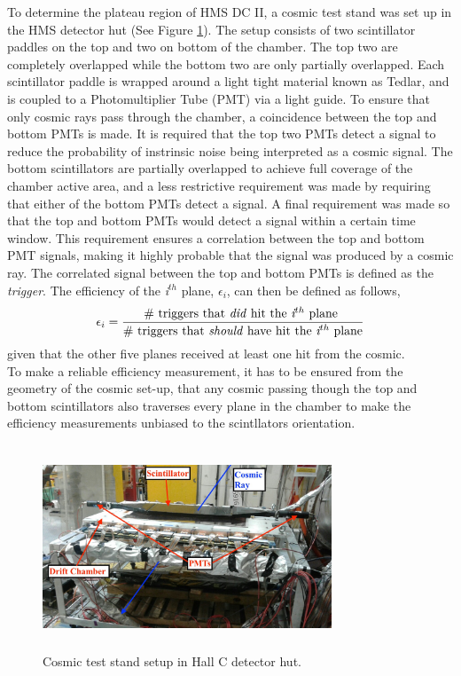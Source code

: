 \documentclass[letterpaper, 10 pt, conference]{ieeeconf}  %
\begin{document}
\indent To determine the plateau region of HMS DC II,  a cosmic test stand was set up in the HMS detector hut (See Figure \ref{fig:cosmic_stand}). The setup consists of two scintillator paddles on the top
and two on bottom of the chamber. The top two are completely overlapped while the bottom two are only partially overlapped. Each scintillator paddle is wrapped around a light tight material known as Tedlar,
and is coupled to a Photomultiplier Tube (PMT) via a light guide. To ensure that only cosmic rays pass through the chamber, a coincidence between the top and bottom PMTs is made. It is required that the top
two PMTs detect a signal to reduce the probability of instrinsic noise being interpreted as a cosmic signal. The bottom scintillators are partially overlapped to achieve full coverage of the chamber active
area, and a less restrictive requirement was made by requiring that either of the bottom PMTs detect a signal. A final requirement was made so that the top and bottom PMTs would detect a signal within a
certain time window. This requirement ensures a correlation between the top and bottom PMT signals, making it highly probable that the signal was produced by a cosmic ray. The correlated signal between the top and
bottom PMTs is defined as the \textit{trigger}. The efficiency of the \textit{i$^{th}$} plane, $\epsilon_{i}$, can then be defined as follows,
\begin{equation}
\epsilon_{i} = \frac{\# \text{ triggers that \textit{did} hit the \textit{i$^{th}$} plane } }{\# \text{ triggers that \textit{should} have hit the \textit{i$^{th}$} plane} } 
\end{equation}
given that the other five planes received at least one hit from the cosmic. \\
\indent To make a reliable efficiency measurement, it has to be ensured from the geometry of the cosmic set-up, that any cosmic passing though the top and bottom scintillators also traverses every plane in the chamber
to make the efficiency measurements unbiased to the scintllators orientation. 
\begin{figure}[h!]
  \centering
  \includegraphics[width=3.4in, height=2.4in]{dc2_tests/dc2_teststand_03.jpg}
  \caption{Cosmic test stand setup in Hall C detector hut.}
  \label{fig:cosmic_stand}
\end{figure} \\
\end{document}
